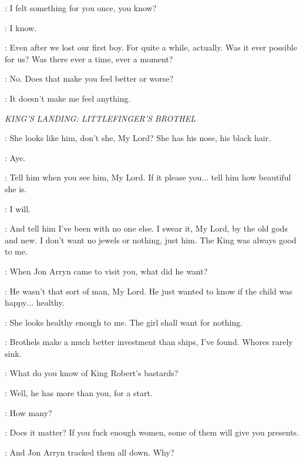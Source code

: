 \CERSEI: I felt something for you once, you know? 

\ROBERT: I know. 

\CERSEI: Even after we lost our first boy. For quite a while, actually. Was it ever possible for us? Was there ever a time, ever a moment? 

\ROBERT: No. Does that make you feel better or worse? 

\CERSEI: It doesn't make me feel anything. 


\scene

\textit{KING'S LANDING: LITTLEFINGER'S BROTHEL} 


\MHAEGEN: She looks like him, don't she, My Lord? She has his nose, his black hair. 

\NED: Aye. 

\MHAEGEN: Tell him when you see him, My Lord. If it please you$\ldots$ tell him how beautiful she is. 

\NED: I will. 

\MHAEGEN: And tell him I've been with no one else. I swear it, My Lord, by the old gods and new. I don't want no jewels or nothing, just him. The King was always good to me. 

\NED: When Jon Arryn came to visit you, what did he want? 

\MHAEGEN: He wasn't that sort of man, My Lord. He just wanted to know if the child was happy$\ldots$ healthy. 

\NED: She looks healthy enough to me. The girl shall want for nothing. 


\LITTLEFINGER: Brothels make a much better investment than ships, I've found. Whores rarely sink. 

\NED: What do you know of King Robert's bastards? 

\LITTLEFINGER: Well, he has more than you, for a start. 

\NED: How many? 

\LITTLEFINGER: Does it matter? If you fuck enough women, some of them will give you presents. 

\NED: And Jon Arryn tracked them all down. Why? 

